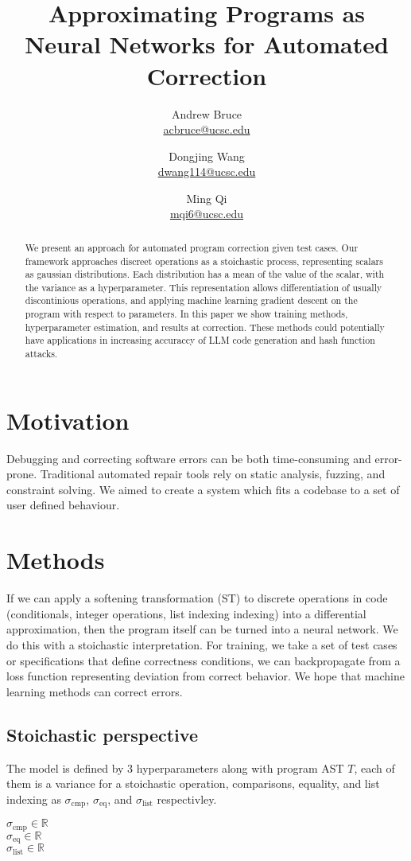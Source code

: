 \documentclass{article}
\title{Approximating Programs as Neural Networks for Automated Correction}
\author{
  Andrew Bruce \\ \href{mailto:acbruce@ucsc.edu}{acbruce@ucsc.edu}
  \and
  Dongjing Wang \\ \href{mailto:dwang114@ucsc.edu}{dwang114@ucsc.edu}
  \and
  Ming Qi \\ \href{mailto:mqi6@ucsc.edu}{mqi6@ucsc.edu}
}
\begin{document}
\maketitle

\begin{abstract}
  We present an approach for automated program correction given test cases. Our framework approaches discreet operations as a stoichastic process, representing scalars as gaussian distributions. Each distribution has a mean of the value of the scalar, with the variance as a hyperparameter. This representation allows differentiation of usually discontinious operations, and applying machine learning gradient descent on the program with respect to parameters. In this paper we show training methods, hyperparameter estimation, and results at correction. These methods could potentially have applications in increasing accuraccy of LLM code generation and hash function attacks.
\end{abstract}

\section*{Motivation}
Debugging and correcting software errors can be both time-consuming and error-prone. Traditional automated repair tools rely on static analysis, fuzzing, and constraint solving. We aimed to create a system which fits a codebase to a set of user defined behaviour.
\section*{Methods}
If we can apply a softening transformation (ST) to discrete operations in code (conditionals, integer operations, list indexing indexing) into a differential approximation, then the program itself can be turned into a neural network. We do this with a stoichastic interpretation. For training, we take a set of test cases or specifications that define correctness conditions, we can backpropagate from a loss function representing deviation from correct behavior. We hope that machine learning methods can correct errors.
\subsection*{Stoichastic perspective}
The model is defined by 3 hyperparameters along with program AST $T$, each of them is a variance for a stoichastic operation, comparisons, equality, and list indexing as $\sigma_{\text{cmp}}$, $\sigma_{\text{eq}}$, and $\sigma_{\text{list}}$ respectivley.
\begin{center}
  $\sigma_{\text{cmp}} \in \mathbb{R}$\\
  $\sigma_{\text{eq}} \in \mathbb{R}$\\
  $\sigma_{\text{list}} \in \mathbb{R}$
\end{center}
\end{document}
